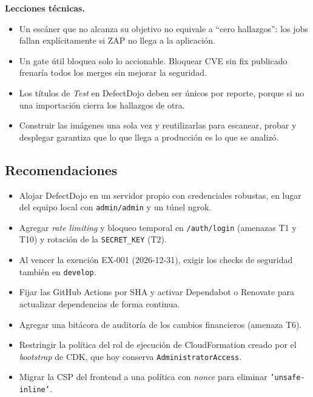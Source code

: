 \textbf{Lecciones técnicas.}
\begin{itemize}
    \item Un escáner que no alcanza su objetivo no equivale a ``cero hallazgos'': los jobs fallan explícitamente si ZAP no llega a la aplicación.
    \item Un gate útil bloquea solo lo accionable. Bloquear CVE sin fix publicado frenaría todos los merges sin mejorar la seguridad.
    \item Los títulos de \textit{Test} en DefectDojo deben ser únicos por reporte, porque si no una importación cierra los hallazgos de otra.
    \item Construir las imágenes una sola vez y reutilizarlas para escanear, probar y desplegar garantiza que lo que llega a producción es lo que se analizó.
\end{itemize}

\subsection{Recomendaciones}

\begin{itemize}
    \item Alojar DefectDojo en un servidor propio con credenciales robustas, en lugar del equipo local con \texttt{admin/admin} y un túnel ngrok.
    \item Agregar \textit{rate limiting} y bloqueo temporal en \texttt{/auth/login} (amenazas T1 y T10) y rotación de la \texttt{SECRET\_KEY} (T2).
    \item Al vencer la exención EX-001 (2026-12-31), exigir los checks de seguridad también en \texttt{develop}.
    \item Fijar las GitHub Actions por SHA y activar Dependabot o Renovate para actualizar dependencias de forma continua.
    \item Agregar una bitácora de auditoría de los cambios financieros (amenaza T6).
    \item Restringir la política del rol de ejecución de CloudFormation creado por el \textit{bootstrap} de CDK, que hoy conserva \texttt{AdministratorAccess}.
    \item Migrar la CSP del frontend a una política con \textit{nonce} para eliminar \texttt{'unsafe-inline'}.
\end{itemize}
